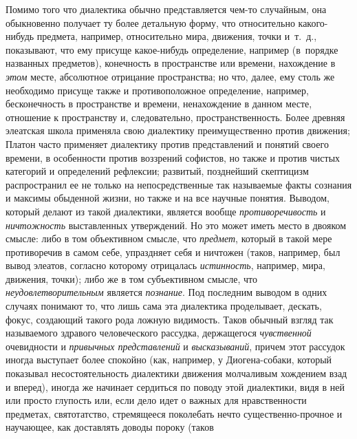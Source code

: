 Помимо того что диалектика обычно представляется чем-то
случайным, она обыкновенно получает ту более детальную форму, что
относительно какого-нибудь предмета, например, относительно мира, движения,
точки и~т.~д., показывают, что ему присуще какое-нибудь определение,
например (в~порядке названных предметов), конечность в пространстве или
времени, нахождение в {\em этом}
месте, абсолютное отрицание пространства; но что, далее, ему
столь же необходимо присуще также и противоположное определение, например,
бесконечность в пространстве и времени, ненахождение в данном месте,
отношение к пространству и, следовательно, пространственность. Более
древняя элеатская школа применяла свою диалектику преимущественно против
движения; Платон часто применяет диалектику против представлений и понятий
своего времени, в особенности против воззрений софистов, но также и против
чистых категорий и определений рефлексии; развитый, позднейший скептицизм
распространил ее не только на непосредственные так называемые факты
сознания и максимы обыденной жизни, но также и на все научные понятия.
Выводом, который делают из такой диалектики, является вообще
{\em противоречивость} и {\em ничтожность}
выставленных утверждений. Но это может иметь место в двояком
смысле: либо в том объективном смысле, что {\em предмет}, который в
такой мере противоречив в самом себе, упраздняет себя и ничтожен (таков,
например, был вывод элеатов, согласно которому отрицалась {\em истинность},
например, мира, движения, точки); либо же в том субъективном
смысле, что {\em неудовлетворительным} является {\em познание}.
Под последним выводом в одних случаях понимают то, что лишь
сама эта диалектика проделывает, дескать, фокус, создающий такого рода
ложную видимость. Таков обычный взгляд так называемого здравого
человеческого рассудка, держащегося {\em чувственной} очевидности и
{\em привычных представлений} и {\em высказываний},
причем этот рассудок иногда выступает более спокойно (как, например, у
Диогена-собаки,
который показывал несостоятельность диалектики движения
молчаливым хождением взад и вперед), иногда же начинает сердиться по поводу
этой диалектики, видя в ней или просто глупость или, если дело идет о
важных для нравственности предметах, святотатство, стремящееся поколебать
нечто существенно-прочное и научающее, как доставлять доводы пороку (таков
